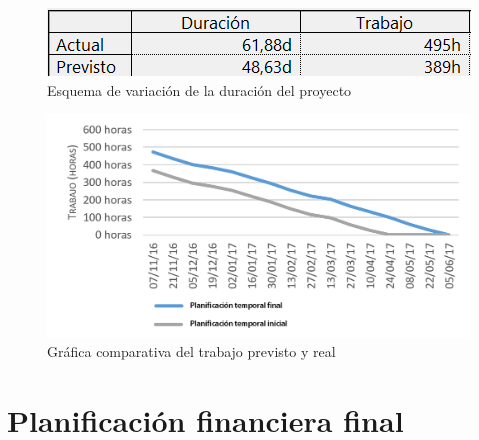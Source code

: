 \documentclass{pclass}
\begin{document}
\begin{figure}[H]
	\centering
	\includegraphics[width=1\textwidth]{img/variacionDuracion}
	\caption{Esquema de variación de la duración del proyecto}
	\label{fig:variacionDuracion}
\end{figure}

\begin{figure}[H]
	\centering
	\includegraphics[width=1\textwidth]{img/graficaComparativaTiempo}
	\caption{Gráfica comparativa del trabajo previsto y real}
	\label{fig:graficaComparativa}
\end{figure}

\section{Planificación financiera final} 
\end{document}
